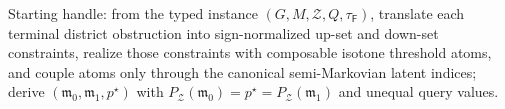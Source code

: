 Starting handle: from the typed instance \((G,M,\mathcal Z,Q,\tau_{\mathsf F})\), translate each terminal district obstruction into sign-normalized up-set and down-set constraints, realize those constraints with composable isotone threshold atoms, and couple atoms only through the canonical semi-Markovian latent indices; derive \((\mathfrak m_0,\mathfrak m_1,p^{\star})\) with \(P_{\mathcal Z}(\mathfrak m_0)=p^{\star}=P_{\mathcal Z}(\mathfrak m_1)\) and unequal query values.